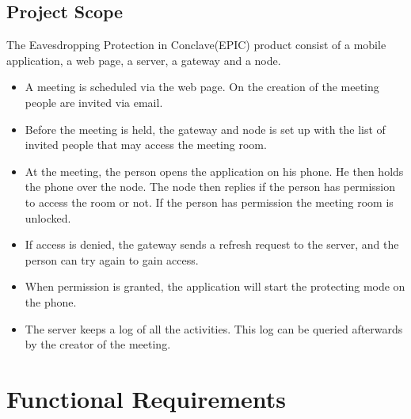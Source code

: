 	\subsection{Project Scope}
		The Eavesdropping Protection in Conclave(EPIC) product consist of a mobile application, a web page, a server, a gateway and a node. 
		\begin{itemize}
		\item A meeting is scheduled via the web page. On the creation of the meeting people are invited via email.
		\item Before the meeting is held, the gateway and node is set up with the list of invited people that may access the meeting room.
		\item At the meeting, the person opens the application on his phone. He then holds the phone over the node. The node then replies if the person has permission to access the room or not. If the person has permission the meeting room is unlocked.
		\item If access is denied, the gateway sends a refresh request to the server, and the person can try again to gain access.
		\item When permission is granted, the application will start the protecting mode on the phone.
		\item The server keeps a log of all the activities. This log can be queried afterwards by the creator of the meeting.
        \end{itemize}



\newpage
\section{Functional Requirements}

	
    
    
	
			




		



